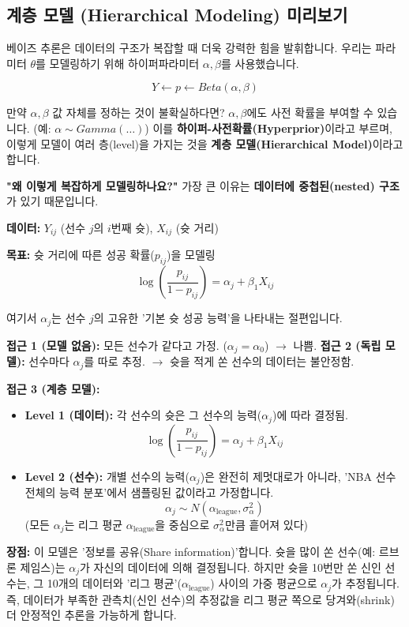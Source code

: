 \documentclass[11pt,a4paper]{book}
\theoremstyle{definition}
\begin{document}
\subsection{계층 모델 (Hierarchical Modeling) 미리보기}

베이즈 추론은 데이터의 구조가 복잡할 때 더욱 강력한 힘을 발휘합니다.
우리는 파라미터 $\theta$를 모델링하기 위해 하이퍼파라미터 $\alpha, \beta$를 사용했습니다.

$$ Y \leftarrow p \leftarrow Beta(\alpha, \beta) $$

만약 $\alpha, \beta$ 값 자체를 정하는 것이 불확실하다면? $\alpha, \beta$에도 사전 확률을 부여할 수 있습니다. (예: $\alpha \sim Gamma(\dots)$)
이를 \textbf{하이퍼-사전확률(Hyperprior)}이라고 부르며, 이렇게 모델이 여러 층(level)을 가지는 것을 \textbf{계층 모델(Hierarchical Model)}이라고 합니다.

\textbf{"왜 이렇게 복잡하게 모델링하나요?"}
가장 큰 이유는 \textbf{데이터에 중첩된(nested) 구조}가 있기 때문입니다.

\begin{examplebox}[title=계층 모델의 필요성: NBA 선수 슛 성공률]
\textbf{데이터:} $Y_{ij}$ (선수 $j$의 $i$번째 슛), $X_{ij}$ (슛 거리)

\textbf{목표:} 슛 거리에 따른 성공 확률($p_{ij}$)을 모델링
$$ \log\left(\frac{p_{ij}}{1-p_{ij}}\right) = \alpha_j + \beta_1 X_{ij} $$

여기서 $\alpha_j$는 선수 $j$의 고유한 '기본 슛 성공 능력'을 나타내는 절편입니다.

\textbf{접근 1 (모델 없음):} 모든 선수가 같다고 가정. ($\alpha_j = \alpha_0$) $\to$ 나쁨.
\textbf{접근 2 (독립 모델):} 선수마다 $\alpha_j$를 따로 추정. $\to$ 슛을 적게 쏜 선수의 데이터는 불안정함.

\textbf{접근 3 (계층 모델):}
\begin{itemize}
    \item \textbf{Level 1 (데이터):} 각 선수의 슛은 그 선수의 능력($\alpha_j$)에 따라 결정됨.
    $$ \log\left(\frac{p_{ij}}{1-p_{ij}}\right) = \alpha_j + \beta_1 X_{ij} $$
    
    \item \textbf{Level 2 (선수):} 개별 선수의 능력($\alpha_j$)은 완전히 제멋대로가 아니라, 'NBA 선수 전체의 능력 분포'에서 샘플링된 값이라고 가정합니다.
    $$ \alpha_j \sim N(\alpha_{\text{league}}, \sigma^2_{\alpha}) $$
    (모든 $\alpha_j$는 리그 평균 $\alpha_{\text{league}}$을 중심으로 $\sigma^2_{\alpha}$만큼 흩어져 있다)
\end{itemize}
\textbf{장점:}
이 모델은 '정보를 공유(Share information)'합니다.
슛을 많이 쏜 선수(예: 르브론 제임스)는 $\alpha_j$가 자신의 데이터에 의해 결정됩니다.
하지만 슛을 10번만 쏜 신인 선수는, 그 10개의 데이터와 '리그 평균'($\alpha_{\text{league}}$) 사이의 가중 평균으로 $\alpha_j$가 추정됩니다.
즉, 데이터가 부족한 관측치(신인 선수)의 추정값을 리그 평균 쪽으로 당겨와(shrink) 더 안정적인 추론을 가능하게 합니다.
\end{examplebox}
\end{document}
